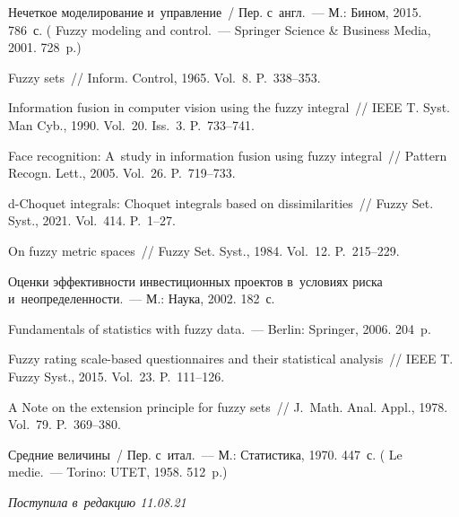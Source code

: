 \begin{multicols}{2}
{{\begin{thebibliography}{99}
 Нечеткое моделирование и~управ\-ле\-ние~/ Пер. с~англ.~--- М.: Бином,  2015. 786~с.
( {Fuzzy modeling and control}.~--- Springer Science \& Business Media, 2001. 728~p.)

 Fuzzy sets~// Inform. Control, 1965. Vol.~8. P.~338--353.

 Information fusion in computer 
vision using the fuzzy integral~// IEEE T. Syst. Man  Cyb.,  1990. Vol.~20. Iss.~3. P.~733--741.

 Face recognition: A~study in 
information fusion using fuzzy integral~// Pattern Recogn. Lett., 2005. Vol.~26.  P.~719--733.

 d-Choquet integrals: 
Choquet integrals based on dissimilarities~// Fuzzy Set. Syst., 2021. Vol.~414. P.~1--27.

 On fuzzy metric spaces~// Fuzzy 
Set. Syst., 1984.  Vol.~12. P.~215--229.

 Оценки эффективности инвестиционных проектов 
в~условиях риска и~не\-оп\-ре\-де\-лен\-ности.~--- М.: Наука, 2002. 182~с.

 Fundamentals of statistics with fuzzy  data.~--- Berlin: Springer, 2006. 204~p.

 Fuzzy rating scale-based questionnaires and their 
statistical analysis~// IEEE T. Fuzzy Syst., 2015. Vol.~23. P.~111--126.

 A Note on the  extension  principle for fuzzy 
sets~// J.~Math. Anal. Appl., 1978. Vol.~79. P.~369--380.

 Средние величины~/ Пер. с~итал.~--- М.: Статистика, 1970. 447~с.
( {Le medie}.~--- Torino: UTET, 1958. 512~p.)

\end{thebibliography}

 }
 }

\end{multicols}

\vspace*{-9pt}

\hfill{\small\textit{Поступила в~редакцию 11.08.21}}

